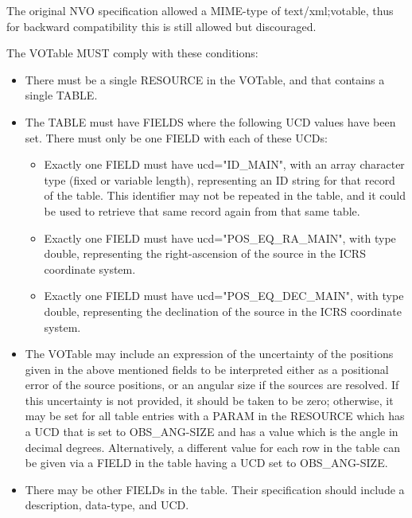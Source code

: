\documentclass[11pt,a4paper]{ivoa}
\begin{document}
\begin{enumerate}
		
		The VOTable MUST comply with these conditions:

		\begin{itemize}
			\item There must be a single RESOURCE in the VOTable,
				and that contains a single TABLE.
			\item The TABLE must have FIELDS where
				the following UCD values have been set. There must only be one FIELD
				with each of these UCDs:
				
				\begin{itemize}
					\item Exactly one FIELD must
						have ucd="ID\_MAIN", with an array character type (fixed or variable
						length), representing an ID string for that record of the table. This
						identifier may not be repeated in the table, and it could be used to
						retrieve that same record again from that same table.
					\item Exactly one
						FIELD must have ucd="POS\_EQ\_RA\_MAIN", with type double, representing
						the right-ascension of the source in the ICRS coordinate system.
					\item
						Exactly one FIELD must have ucd="POS\_EQ\_DEC\_MAIN", with type double,
						representing the declination of the source in the ICRS coordinate system.
				\end{itemize}
			
			\item The VOTable may include an expression of the
				uncertainty of the positions given in the above mentioned fields to be
				interpreted either as a positional error of the source positions, or an
				angular size if the sources are resolved. If this uncertainty is not
				provided, it should be taken to be zero; otherwise, it may be set for
				all table entries with a PARAM in the RESOURCE which has a UCD that is
				set to OBS\_ANG-SIZE and has a value which is the angle in decimal
				degrees. Alternatively, a different value for each row in the table can
				be given via a FIELD in the table having a UCD set to OBS\_ANG-SIZE.
			\item There may be other FIELDs in the table. Their specification should
				include a description, data-type, and UCD.
		\end{itemize}
		

\end{enumerate}
\end{document}
